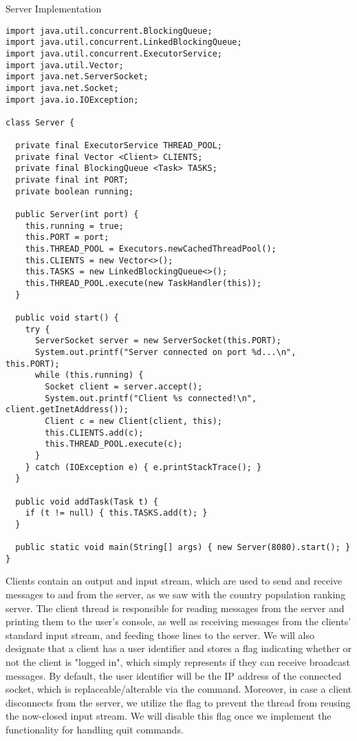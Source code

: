 \begin{cl}[]{Server Implementation}
\begin{lstlisting}[language=MyJava]
import java.util.concurrent.BlockingQueue;
import java.util.concurrent.LinkedBlockingQueue;
import java.util.concurrent.ExecutorService;
import java.util.Vector;
import java.net.ServerSocket;
import java.net.Socket;
import java.io.IOException;

class Server {

  private final ExecutorService THREAD_POOL;
  private final Vector <Client> CLIENTS;
  private final BlockingQueue <Task> TASKS;
  private final int PORT;
  private boolean running;

  public Server(int port) {
    this.running = true;
    this.PORT = port;
    this.THREAD_POOL = Executors.newCachedThreadPool();
    this.CLIENTS = new Vector<>();
    this.TASKS = new LinkedBlockingQueue<>();
    this.THREAD_POOL.execute(new TaskHandler(this));
  }

  public void start() {
    try {
      ServerSocket server = new ServerSocket(this.PORT);
      System.out.printf("Server connected on port %d...\n", this.PORT);
      while (this.running) {
        Socket client = server.accept();
        System.out.printf("Client %s connected!\n", client.getInetAddress());
        Client c = new Client(client, this);
        this.CLIENTS.add(c);
        this.THREAD_POOL.execute(c);
      }
    } catch (IOException e) { e.printStackTrace(); }
  }

  public void addTask(Task t) {
    if (t != null) { this.TASKS.add(t); }
  }

  public static void main(String[] args) { new Server(8080).start(); }
}
\end{lstlisting}
\end{cl}

Clients contain an output and input stream, which are used to send and receive messages to and from the server, as we saw with the country population ranking server. The client thread is responsible for reading messages from the server and printing them to the user's console, as well as receiving messages from the clients' standard input stream, and feeding those lines to the server. We will also designate that a client has a user identifier and stores a flag indicating whether or not the client is "logged in", which simply represents if they can receive broadcast messages. By default, the user identifier will be the IP address of the connected socket, which is replaceable/alterable via the  command. Moreover, in case a client disconnects from the server, we utilize the  flag to prevent the thread from reusing the now-closed input stream. We will disable this flag once we implement the functionality for handling quit commands.

